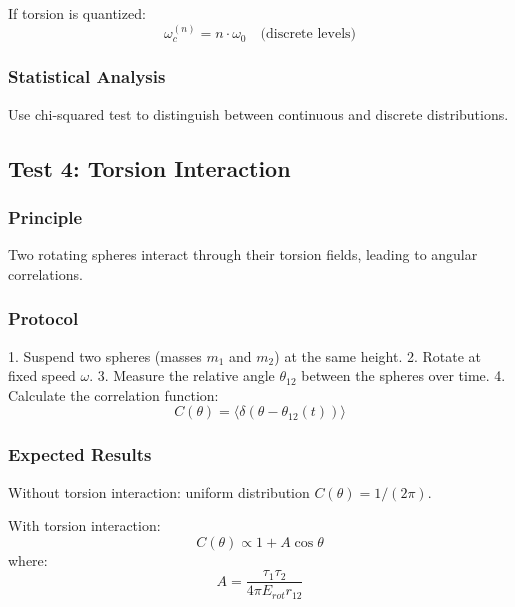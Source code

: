 \documentclass[UTF8]{ctex}\n\documentclass[12pt,a4paper]{article}
\begin{document}
If torsion is quantized:
\begin{equation}
    \omega_c^{(n)} = n \cdot \omega_0 \quad \text{(discrete levels)}
\end{equation}

\subsubsection{Statistical Analysis}

Use chi-squared test to distinguish between continuous and discrete distributions.

\subsection{Test 4: Torsion Interaction}

\subsubsection{Principle}

Two rotating spheres interact through their torsion fields, leading to angular correlations.

\subsubsection{Protocol}

1. Suspend two spheres (masses $m_1$ and $m_2$) at the same height.
2. Rotate at fixed speed $\omega$.
3. Measure the relative angle $\theta_{12}$ between the spheres over time.
4. Calculate the correlation function:
\begin{equation}
    C(\theta) = \langle\delta(\theta - \theta_{12}(t))\rangle
\end{equation}

\subsubsection{Expected Results}

Without torsion interaction: uniform distribution $C(\theta) = 1/(2\pi)$.

With torsion interaction:
\begin{equation}
    C(\theta) \propto 1 + A\cos\theta
\end{equation}
where:
\begin{equation}
    A = \frac{\tau_1\tau_2}{4\pi E_{rot}r_{12}}
\end{equation}
\end{document}
